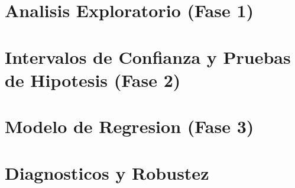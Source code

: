 \documentclass[11pt, a4paper]{article}
\begin{document}
\section{Analisis Exploratorio (Fase 1)}

\section{Intervalos de Confianza y Pruebas de Hipotesis (Fase 2)}

\section{Modelo de Regresion (Fase 3)}

\section{Diagnosticos y Robustez}

\end{document}

